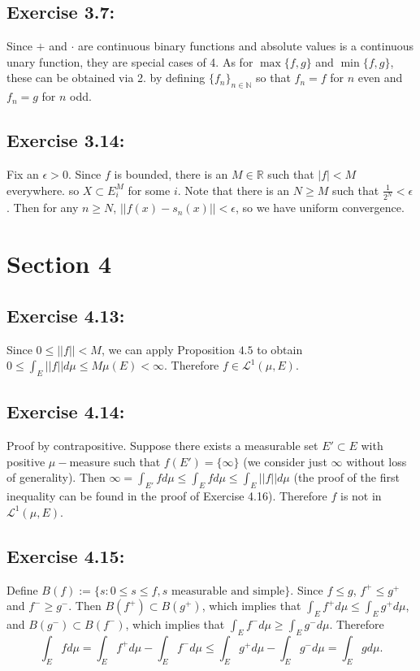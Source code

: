 \documentclass[11.5pt, letterpaper, bibtotoc,
    tablecaptionabove, figurecaptionabove]{article}
\begin{document}
\subsection*{Exercise 3.7:}
Since $+$ and $\cdot$ are continuous binary functions and
absolute values is a continuous unary function, they are special cases of 4.
As for $\max\{f, g\}$ and $\min\{f, g\}$, these can be obtained via 2.
by defining $\{f_n\}_{n\in\mathbb N}$ so that $f_n = f$ for $n$ even
and $f_n = g$ for $n$ odd.

\subsection*{Exercise 3.14:}
Fix an $\epsilon>0$.
Since $f$ is bounded, there is an $M\in\mathbb R$ such that $|f|<M$ everywhere.
so $X\subset E_i^M$ for some $i$.
Note that there is an $N\geq M$ such that $\frac{1}{2^N}<\epsilon$.
Then for any $n\geq N$, $||f(x)-s_n(x)||<\epsilon$, so we have uniform convergence.

\section*{Section 4}

\subsection*{Exercise 4.13:}
Since $0\leq||f||<M$, we can apply Proposition $4.5$ to obtain
$0\le\int_E||f||d\mu\le M\mu(E)<\infty$.
Therefore $f\in\mathcal L^1(\mu, E)$.

\subsection*{Exercise 4.14:}
Proof by contrapositive.
Suppose there exists a measurable set $E'\subset E$ 
with positive $\mu-$measure such that $f(E')=\{\infty\}$
(we consider just $\infty$ without loss of generality).
Then $\infty=\int_{E'}fd\mu\leq\int_Efd\mu\leq\int_E||f||d\mu$
(the proof of the first inequality can be found in the proof of Exercise 4.16).
Therefore $f$ is not in $\mathcal L^1(\mu, E)$.

\subsection*{Exercise 4.15:}
Define $B(f):=\{s: 0\leq s\leq f, s \text{ measurable and simple}\}$.
Since $f\leq g$, $f^+\leq g^+$ and $f^-\geq g^-$.
Then $B(f^+)\subset B(g^+)$, which implies that $\int_Ef^+d\mu\leq\int_Eg^+d\mu$,
and $B(g^-)\subset B(f^-)$, which implies that $\int_Ef^-d\mu\geq\int_Eg^-d\mu$.
Therefore 
\begin{equation*}
\int_Efd\mu=\int_Ef^+d\mu-\int_Ef^-d\mu\leq\int_Eg^+d\mu-\int_Eg^-d\mu=\int_Egd\mu.
\end{equation*}
\end{document}
